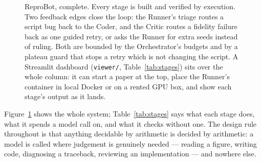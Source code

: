 \documentclass[11pt]{article}
\begin{document}
\begin{figure}[tbp]
\caption{ReproBot, complete. Every stage is built and verified by execution. Two feedback edges
close the loop: the Runner's triage routes a script bug back to the Coder, and the Critic routes a
fidelity failure back as one guided retry, or asks the Runner for extra seeds instead of ruling.
Both are bounded by the Orchestrator's budgets and by a plateau guard that stops a retry which is
not changing the script. A Streamlit dashboard (\texttt{viewer/}, Table~\ref{tab:stages}) sits
over the whole column: it can start a paper at the top, place the Runner's container in local
Docker or on a rented GPU box, and show each stage's output as it lands.}
\label{fig:pipeline}
\end{figure}


Figure~\ref{fig:pipeline} shows the whole system; Table~\ref{tab:stages} says what each stage
does, what it spends a model call on, and what it checks without one. The design rule throughout
is that anything decidable by arithmetic is decided by arithmetic: a model is called where
judgement is genuinely needed --- reading a figure, writing code, diagnosing a traceback,
reviewing an implementation --- and nowhere else.
\end{document}
